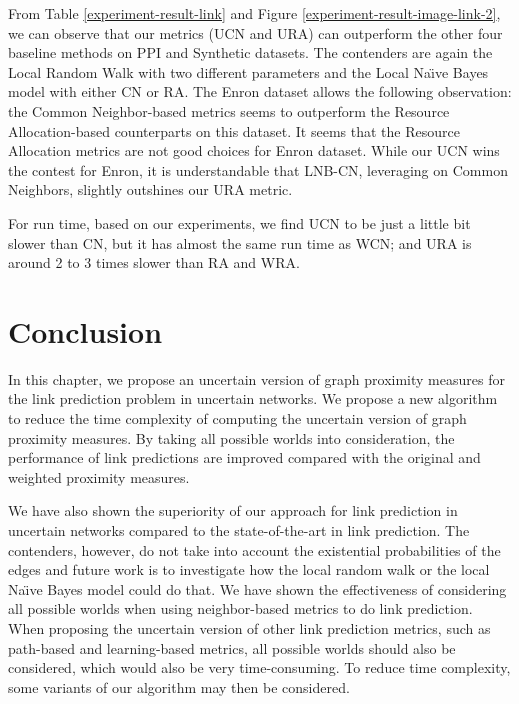 \documentclass[\main/thesis.tex]{subfiles}
\begin{document}
From Table \ref{experiment-result-link} and Figure \ref{experiment-result-image-link-2}, we can observe that our metrics (UCN and URA) can outperform the other four baseline methods on PPI and Synthetic datasets. The contenders are again the Local Random Walk with two different parameters and the Local Na\"{\i}ve Bayes model with either CN or RA. The Enron dataset allows the following observation: the Common Neighbor-based metrics seems to outperform the Resource Allocation-based counterparts on this dataset.  It seems that the Resource Allocation metrics are not good choices for Enron dataset. While our UCN wins the contest for Enron, it is understandable that LNB-CN, leveraging on Common Neighbors, slightly outshines our URA metric.

For run time, based on our experiments, we find UCN to be just a little bit slower than CN, but it has almost the same run time as WCN; and URA is around 2 to 3 times slower than RA and WRA.
\section{Conclusion}
In this chapter, we propose an uncertain version of graph proximity measures for the link prediction problem in uncertain networks. We propose a new algorithm to reduce the time complexity of computing the uncertain version of graph proximity measures. By taking all possible worlds into consideration, the performance of link predictions are improved compared with the original and weighted proximity measures.

We have also shown the superiority of our approach for link prediction in uncertain networks compared to the state-of-the-art in link prediction. The contenders, however, do not take into account the existential probabilities of the edges and future work is to investigate how the local random walk or the local Na\"{\i}ve Bayes model could do that.
We have shown the effectiveness of considering all possible worlds when using neighbor-based metrics to do link prediction. When proposing the uncertain version of other link prediction metrics, such as path-based and learning-based metrics, all possible worlds should also be considered, which would also be very time-consuming. To reduce time complexity, some variants of our algorithm may then be considered.
\end{document}
